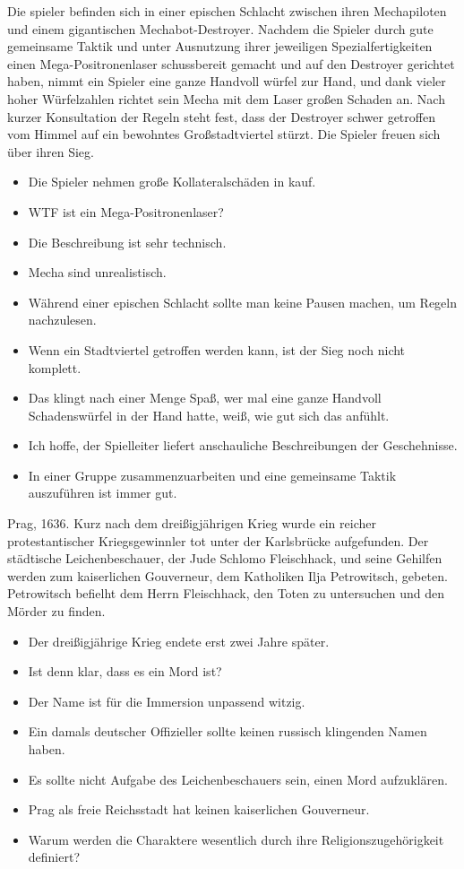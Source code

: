 \documentclass{article}
\begin{document}
Die spieler befinden sich in einer epischen Schlacht zwischen ihren Mechapiloten und einem gigantischen Mechabot-Destroyer.
Nachdem die Spieler durch gute gemeinsame Taktik und unter Ausnutzung ihrer jeweiligen Spezialfertigkeiten einen Mega-Positronenlaser schussbereit gemacht und auf den Destroyer gerichtet haben,
nimmt ein Spieler eine ganze Handvoll würfel zur Hand, und dank vieler hoher Würfelzahlen richtet sein Mecha mit dem Laser großen Schaden an.
Nach kurzer Konsultation der Regeln steht fest, dass der Destroyer schwer getroffen vom Himmel auf ein bewohntes Großstadtviertel stürzt.
Die Spieler freuen sich über ihren Sieg.
\begin{itemize}
\item Die Spieler nehmen große Kollateralschäden in kauf.
\item WTF ist ein Mega-Positronenlaser?
\item Die Beschreibung ist sehr technisch.
\item Mecha sind unrealistisch.
\item Während einer epischen Schlacht sollte man keine Pausen machen, um Regeln nachzulesen.
\item Wenn ein Stadtviertel getroffen werden kann, ist der Sieg noch nicht komplett.
\item Das klingt nach einer Menge Spaß, wer mal eine ganze Handvoll Schadenswürfel in der Hand hatte, weiß, wie gut sich das anfühlt.
\item Ich hoffe, der Spielleiter liefert anschauliche Beschreibungen der Geschehnisse.
\item In einer Gruppe zusammenzuarbeiten und eine gemeinsame Taktik auszuführen ist immer gut.
\end{itemize}
Prag, 1636. Kurz nach dem dreißigjährigen Krieg wurde ein reicher protestantischer Kriegsgewinnler tot unter der Karlsbrücke aufgefunden.
Der städtische Leichenbeschauer, der Jude Schlomo Fleischhack,
und seine Gehilfen werden zum kaiserlichen Gouverneur, dem Katholiken Ilja Petrowitsch, gebeten.
Petrowitsch befielht dem Herrn Fleischhack, den Toten zu untersuchen und den Mörder zu finden.
\begin{itemize}
\item Der dreißigjährige Krieg endete erst zwei Jahre später.
\item Ist denn klar, dass es ein Mord ist?
\item Der Name ist für die Immersion unpassend witzig.
\item Ein damals deutscher Offizieller sollte keinen russisch klingenden Namen haben.
\item Es sollte nicht Aufgabe des Leichenbeschauers sein, einen Mord aufzuklären.
\item Prag als freie Reichsstadt hat keinen kaiserlichen Gouverneur.
\item Warum werden die Charaktere wesentlich durch ihre Religionszugehörigkeit definiert?
\end{itemize}
\end{document}
